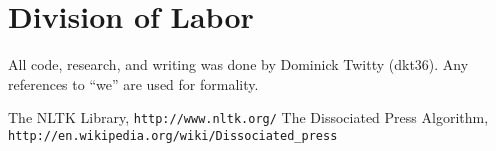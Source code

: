 \documentclass[12pt]{article}
\begin{document}
\section{Division of Labor}
All code, research, and writing was done by Dominick Twitty (dkt36). Any references to ``we'' are used for formality. 

\begin{thebibliography}{1}
 The NLTK Library, 
\verb|http://www.nltk.org/|
 The Dissociated Press Algorithm,
\verb|http://en.wikipedia.org/wiki/Dissociated_press|
\end{thebibliography}
\end{document}
